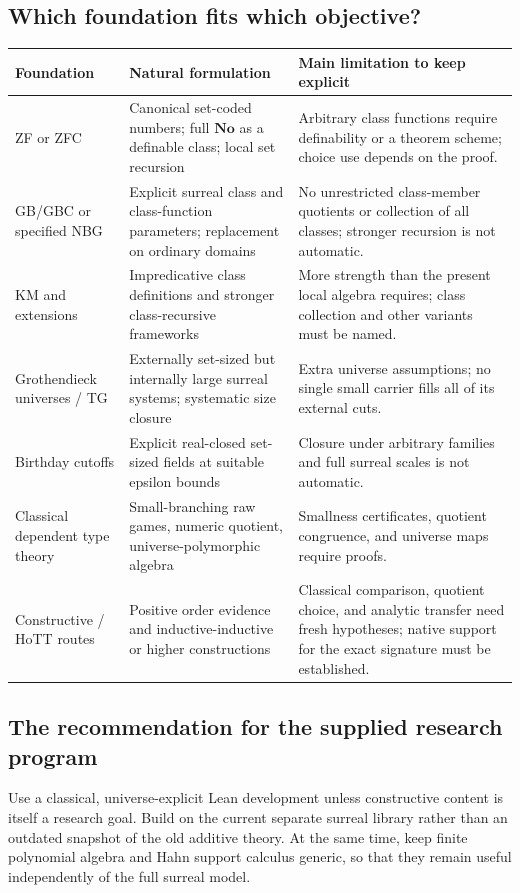 \documentclass[11pt,letterpaper]{article}
\numberwithin{equation}{section}
\theoremstyle{definition}
\theoremstyle{remark}
\newcommand{\No}{\mathbf{No}}
\begin{document}
\subsection{Which foundation fits which objective?}
\begin{longtable}{@{}P{0.19\textwidth}P{0.35\textwidth}P{0.37\textwidth}@{}}
\toprule
Foundation & Natural formulation & Main limitation to keep explicit\\
\midrule\endhead
ZF or ZFC & Canonical set-coded numbers; full $\No$ as a definable class; local set recursion & Arbitrary class functions require definability or a theorem scheme; choice use depends on the proof.\\[0.55em]
GB/GBC or specified NBG & Explicit surreal class and class-function parameters; replacement on ordinary domains & No unrestricted class-member quotients or collection of all classes; stronger recursion is not automatic.\\[0.55em]
KM and extensions & Impredicative class definitions and stronger class-recursive frameworks & More strength than the present local algebra requires; class collection and other variants must be named.\\[0.55em]
Grothendieck universes / TG & Externally set-sized but internally large surreal systems; systematic size closure & Extra universe assumptions; no single small carrier fills all of its external cuts.\\[0.55em]
Birthday cutoffs & Explicit real-closed set-sized fields at suitable epsilon bounds & Closure under arbitrary families and full surreal scales is not automatic.\\[0.55em]
Classical dependent type theory & Small-branching raw games, numeric quotient, universe-polymorphic algebra & Smallness certificates, quotient congruence, and universe maps require proofs.\\[0.55em]
Constructive / HoTT routes & Positive order evidence and inductive-inductive or higher constructions & Classical comparison, quotient choice, and analytic transfer need fresh hypotheses; native support for the exact signature must be established.\\
\bottomrule
\end{longtable}

\subsection{The recommendation for the supplied research program}
Use a classical, universe-explicit Lean development unless constructive content is itself a research goal. Build on the current separate surreal library rather than an outdated snapshot of the old additive theory. At the same time, keep finite polynomial algebra and Hahn support calculus generic, so that they remain useful independently of the full surreal model.
\end{document}
